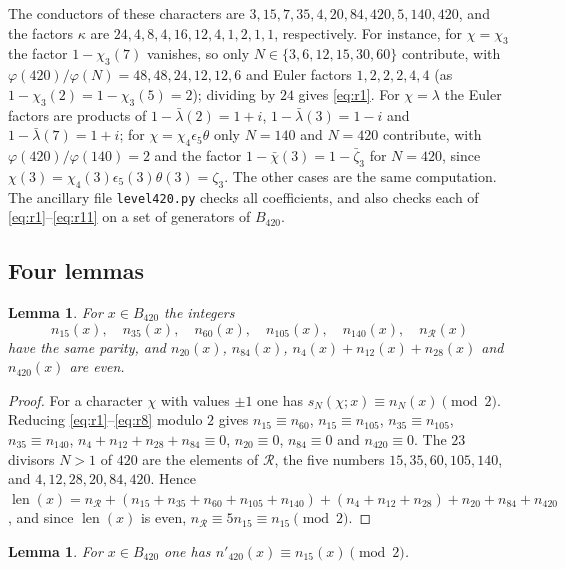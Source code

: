 \documentclass[11pt]{amsart}
\newtheorem{lemma}[theorem]{Lemma}
\theoremstyle{definition}
\theoremstyle{remark}
\numberwithin{equation}{section}
\newcommand{\cR}{\mathcal{R}}
\newcommand{\len}{\operatorname{len}}
\begin{document}
The conductors of these characters are $3,15,7,35,4,20,84,420,5,140,420$, and the factors $\kappa$ are $24,4,8,4,16,12,4,1,2,1,1$, respectively. For instance, for $\chi=\chi_3$ the factor $1-\chi_3(7)$ vanishes, so only $N\in\{3,6,12,15,30,60\}$ contribute, with $\varphi(420)/\varphi(N)=48,48,24,12,12,6$ and Euler factors $1,2,2,2,4,4$ (as $1-\chi_3(2)=1-\chi_3(5)=2$); dividing by $24$ gives \eqref{eq:r1}. For $\chi=\lambda$ the Euler factors are products of $1-\bar\lambda(2)=1+i$, $1-\bar\lambda(3)=1-i$ and $1-\bar\lambda(7)=1+i$; for $\chi=\chi_4\epsilon_5\theta$ only $N=140$ and $N=420$ contribute, with $\varphi(420)/\varphi(140)=2$ and the factor $1-\bar\chi(3)=1-\bar\zeta_3$ for $N=420$, since $\chi(3)=\chi_4(3)\epsilon_5(3)\theta(3)=\zeta_3$. The other cases are the same computation. The ancillary file \texttt{level420.py} checks all coefficients, and also checks each of \eqref{eq:r1}--\eqref{eq:r11} on a set of generators of $B_{420}$.

\subsection{Four lemmas}

\begin{lemma}\label{lem:parity420}
For $x\in B_{420}$ the integers
\[
n_{15}(x),\quad n_{35}(x),\quad n_{60}(x),\quad n_{105}(x),\quad n_{140}(x),\quad n_\cR(x)
\]
have the same parity, and $n_{20}(x)$, $n_{84}(x)$, $n_4(x)+n_{12}(x)+n_{28}(x)$ and $n_{420}(x)$ are even.
\end{lemma}

\begin{proof}
For a character $\chi$ with values $\pm1$ one has $s_N(\chi;x)\equiv n_N(x)\pmod2$. Reducing \eqref{eq:r1}--\eqref{eq:r8} modulo $2$ gives $n_{15}\equiv n_{60}$, $n_{15}\equiv n_{105}$, $n_{35}\equiv n_{105}$, $n_{35}\equiv n_{140}$, $n_4+n_{12}+n_{28}+n_{84}\equiv0$, $n_{20}\equiv0$, $n_{84}\equiv0$ and $n_{420}\equiv0$. The $23$ divisors $N>1$ of $420$ are the elements of $\cR$, the five numbers $15,35,60,105,140$, and $4,12,28,20,84,420$. Hence $\len(x)=n_\cR+(n_{15}+n_{35}+n_{60}+n_{105}+n_{140})+(n_4+n_{12}+n_{28})+n_{20}+n_{84}+n_{420}$, and since $\len(x)$ is even, $n_\cR\equiv5n_{15}\equiv n_{15}\pmod 2$.
\end{proof}

\begin{lemma}\label{lem:gap420}
For $x\in B_{420}$ one has $n'_{420}(x)\equiv n_{15}(x)\pmod2$.
\end{lemma}
\end{document}
